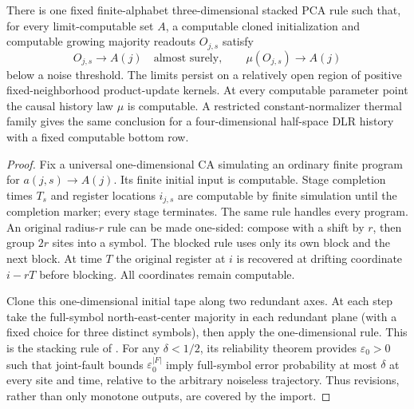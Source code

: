\begin{theorem}\label{thm:reliable-readout}
There is one fixed finite-alphabet three-dimensional stacked PCA
rule such that, for every limit-computable set $A$, a computable
cloned initialization and computable growing majority readouts
$O_{j,s}$ satisfy
\[
 O_{j,s}\longrightarrow A(j)\quad\text{almost surely},\qquad
 \mu(O_{j,s})\longrightarrow A(j)
\]
below a noise threshold. The limits persist on a relatively open
region of positive fixed-neighborhood product-update kernels.
At every computable parameter point the causal history law $\mu$
is computable. A restricted constant-normalizer thermal family gives
the same conclusion for a four-dimensional half-space DLR history
with a fixed computable bottom row.
\end{theorem}
\begin{proof}
Fix a universal one-dimensional CA simulating an ordinary finite
program for $a(j,s)\to A(j)$. Its finite initial input is computable.
Stage completion times $T_s$ and register locations $i_{j,s}$ are
computable by finite simulation until the completion marker; every
stage terminates. The same rule handles every program.
An original radius-$r$ rule can be made one-sided: compose with a
shift by $r$, then group $2r$ sites into a symbol. The blocked rule
uses only its own block and the next block. At time $T$ the original
register at $i$ is recovered at drifting coordinate $i-rT$ before
blocking. All coordinates remain computable.

Clone this one-dimensional initial tape along two redundant axes.
At each step take the full-symbol north-east-center majority in
each redundant plane (with a fixed choice for three distinct
symbols), then apply the one-dimensional rule. This is the stacking
rule of \cite[Section~3.1]{thermalTrajectories}. For any
$\delta<1/2$, its reliability theorem provides $\varepsilon_0>0$
such that joint-fault bounds $\varepsilon_0^{|F|}$ imply full-symbol
error probability at most $\delta$ at every site and time, relative
to the arbitrary noiseless trajectory. Thus revisions, rather than
only monotone outputs, are covered by the import.


\end{proof}

